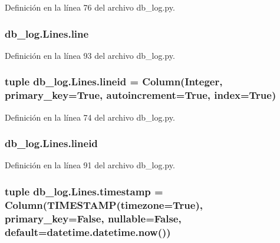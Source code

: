 Definición en la línea 76 del archivo db\-\_\-log.\-py.

\hypertarget{classdb__log_1_1_lines_a2bdb98ff311182c24248853587f3ebb9}{
\subsubsection[{line}]{\setlength{\rightskip}{0pt plus 5cm}db\-\_\-log.\-Lines.\-line}}\label{classdb__log_1_1_lines_a2bdb98ff311182c24248853587f3ebb9}


Definición en la línea 93 del archivo db\-\_\-log.\-py.

\hypertarget{classdb__log_1_1_lines_a3356fd4f820f9182bf824d0b3e1b537b}{
\subsubsection[{lineid}]{\setlength{\rightskip}{0pt plus 5cm}tuple db\-\_\-log.\-Lines.\-lineid = Column(Integer, primary\-\_\-key=True, autoincrement=True, index=True)\hspace{0.3cm}{\ttfamily [static]}}}\label{classdb__log_1_1_lines_a3356fd4f820f9182bf824d0b3e1b537b}


Definición en la línea 74 del archivo db\-\_\-log.\-py.

\hypertarget{classdb__log_1_1_lines_af96b35a0ff4187be6583293d21f56c52}{
\subsubsection[{lineid}]{\setlength{\rightskip}{0pt plus 5cm}db\-\_\-log.\-Lines.\-lineid}}\label{classdb__log_1_1_lines_af96b35a0ff4187be6583293d21f56c52}


Definición en la línea 91 del archivo db\-\_\-log.\-py.

\hypertarget{classdb__log_1_1_lines_a19e178d833d57124bd08401e99865f3c}{
\subsubsection[{timestamp}]{\setlength{\rightskip}{0pt plus 5cm}tuple db\-\_\-log.\-Lines.\-timestamp = Column(T\-I\-M\-E\-S\-T\-A\-M\-P(timezone=True), primary\-\_\-key=False, nullable=False, default=datetime.\-datetime.\-now())\hspace{0.3cm}{\ttfamily [static]}}}\label{classdb__log_1_1_lines_a19e178d833d57124bd08401e99865f3c}


